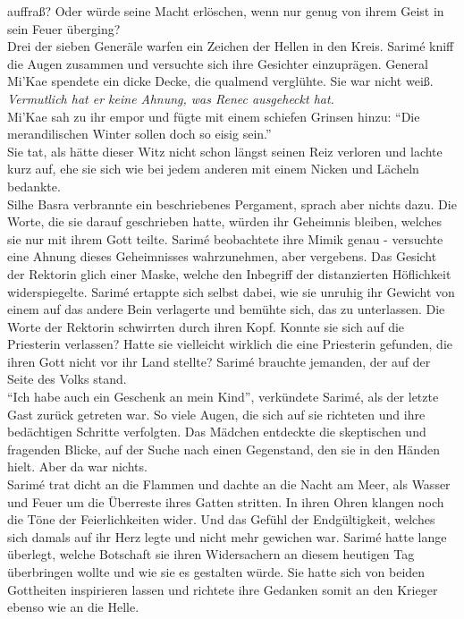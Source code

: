 auffraß? Oder würde seine Macht erlöschen, wenn nur genug von ihrem Geist in sein Feuer überging?\\
Drei der sieben Generäle warfen ein Zeichen der Hellen in den Kreis. Sarimé kniff die Augen 
zusammen und versuchte sich ihre Gesichter einzuprägen. General Mi'Kae spendete ein dicke Decke, 
die qualmend verglühte. Sie war nicht weiß. \textit{Vermutlich hat er keine Ahnung, was Renec 
ausgeheckt hat.}\\
Mi'Kae sah zu ihr empor und fügte mit einem schiefen Grinsen hinzu: ``Die merandilischen Winter 
sollen doch so eisig sein.''\\
Sie tat, als hätte dieser Witz nicht schon längst seinen Reiz verloren und lachte kurz auf, ehe sie 
sich wie bei jedem anderen mit einem Nicken und Lächeln bedankte.\\
Silhe Basra verbrannte ein beschriebenes Pergament, sprach aber nichts dazu. Die Worte, die sie 
darauf geschrieben hatte, würden ihr Geheimnis bleiben, welches sie nur mit ihrem Gott teilte. 
Sarimé beobachtete ihre Mimik genau - versuchte eine Ahnung dieses Geheimnisses wahrzunehmen, aber 
vergebens. Das Gesicht der Rektorin glich einer Maske, welche den Inbegriff der distanzierten 
Höflichkeit widerspiegelte. Sarimé ertappte sich selbst dabei, wie sie unruhig ihr Gewicht von 
einem auf das andere Bein verlagerte und bemühte sich, das zu unterlassen. Die Worte der Rektorin 
schwirrten durch ihren Kopf. Konnte sie sich auf die Priesterin verlassen? Hatte sie vielleicht 
wirklich die eine Priesterin gefunden, die ihren Gott nicht vor ihr Land stellte? Sarimé brauchte 
jemanden, der auf der Seite des Volks stand.\\
``Ich habe auch ein Geschenk an mein Kind'', verkündete Sarimé, als der letzte Gast zurück getreten 
war. So viele Augen, die sich auf sie richteten und ihre bedächtigen Schritte verfolgten. Das 
Mädchen entdeckte die skeptischen und fragenden Blicke, auf der Suche nach einen Gegenstand, den 
sie in den Händen hielt. Aber da war nichts.\\
Sarimé trat dicht an die Flammen und dachte an die Nacht am Meer, als Wasser und Feuer um die 
Überreste ihres Gatten stritten. In ihren Ohren klangen noch die Töne der Feierlichkeiten wider. 
Und das Gefühl der Endgültigkeit, welches sich damals auf ihr Herz legte und nicht mehr gewichen 
war. Sarimé hatte lange überlegt, welche Botschaft sie ihren Widersachern an diesem heutigen Tag 
überbringen wollte und wie sie es gestalten würde. Sie hatte sich von beiden Gottheiten inspirieren 
lassen und richtete ihre Gedanken somit an den Krieger ebenso wie an die Helle.\\
